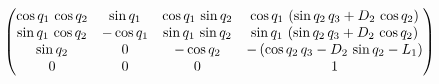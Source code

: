 $$\ifx\endpmatrix\undefined\pmatrix{\else\begin{pmatrix}\fi \cos 
 q_{1}\,\cos q_{2}&\sin q_{1}&\cos q_{1}\,\sin q_{2}&\cos q_{1}\,
 \left(\sin q_{2}\,q_{3}+D_{2}\,\cos q_{2}\right)\cr \sin q_{1}\,
 \cos q_{2}&-\cos q_{1}&\sin q_{1}\,\sin q_{2}&\sin q_{1}\,\left(
 \sin q_{2}\,q_{3}+D_{2}\,\cos q_{2}\right)\cr \sin q_{2}&0&-\cos 
 q_{2}&-\left(\cos q_{2}\,q_{3}-D_{2}\,\sin q_{2}-L_{1}\right)\cr 0&0
 &0&1\cr \ifx\endpmatrix\undefined}\else\end{pmatrix}\fi $$
